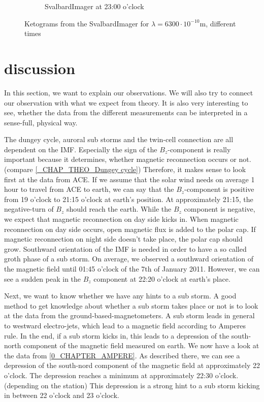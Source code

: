 \documentclass[10pt,a4paper]{article}
\begin{document}
\begin{figure}[h]
\begin{subfigure}{0.3\textwidth}
	\caption{ SvalbardImager at 23:00 o'clock \label{SBI_6_23}}
\end{subfigure}
\caption{Ketograms from the SvalbardImager for $\lambda=6300 \cdot 10^{-10} \mathrm{m}$, different times }
\label{SBI_6_timedevelop}
\end{figure}

\section{discussion \label{discussion}}

In this section, we want to explain our observations. We will also try to connect our observation with what we expect from theory. 
It is also very interesting to see, whether the data from the different measurements can be interpreted in a sense-full, physical way.

The dungey cycle, auroral sub storms and the twin-cell connection are all dependent on the IMF. Especially the sign of the $B_z$-component is really important because it determines, whether magnetic reconnection occurs or not. (compare \ref{_CHAP_THEO_Dungey cycle}) Therefore, it makes sense to look first at the data from ACE. If we assume that the solar wind needs on average 1 hour to travel from ACE to earth, we can say that the $B_z$-component is positive from 19 o'clock to 21:15 o'clock at earth's position. At approximately 21:15, the negative-turn of $B_z$ should reach the earth. 
While the $B_z$ component is negative, we expect that magnetic reconnection on day side kicks in. When magnetic reconnection on day side occurs, open magnetic flux is added to the polar cap. If magnetic reconnection on night side doesn't take place, the polar cap should grow. 
Southward orientation of the IMF is needed in order to have a so called groth phase of a sub storm. 
On average, we observed a southward orientation of the magnetic field until 01:45 o'clock of the 7th of January 2011. However, we can see a sudden peak in the $B_z$ component at 22:20 o'clock at earth's place. 

Next, we want to know whether we have any hints to a sub storm. A good method to get knowledge about whether a sub storm takes place or not is to look at the data from the ground-based-magnetometers. A sub storm leads in general to westward electro-jets, which lead to a magnetic field according to Amperes rule. In the end, if a sub storm kicks in, this leads to a depression of the south-north component of the magnetic field measured on earth. 
We now have a look at the data from \ref{0_CHAPTER_AMPERE}. As described there, we can see a depression of the south-nord component of the magnetic field at approximately 22 o'clock. The depression reaches a minimum at approximately 22:30 o'clock. (depending on the station) This depression is a strong hint to a sub storm kicking in between 22 o'clock and 23 o'clock.
\end{document}
